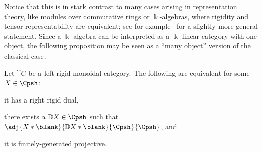 Notice that this is in stark contrast to many cases arising in representation theory,
like modules over commutative rings or \(\Bbbk\)\hyp{}algebras,
where rigidity and tensor representability are equivalent;
see for example~\cite[Proposition~2.1]{niefield17:coexp} for a slightly more general statement.
Since a \(\Bbbk\)\hyp{}algebra can be interpreted as a \(\Bbbk\)\hyp{}linear category with one object,
the following proposition may be seen as a ``many object'' version of the classical case.

\begin{proposition}\label{prop:characterisation-of-rigidity}
  Let \(\cat{C}\) be a left rigid monoidal category.
  The following are equivalent for some \(X \in \Cpsh\):
  \begin{thmlist}[noitemsep]
  \item\label{itm:char-rigid} it has a right rigid dual,
  \item\label{itm:char-trep} there exists a \(\mathbb{D}X \in \Cpsh\) such that \(\adj{X * \blank}{\mathbb{D}X * \blank}{\Cpsh}{\Cpsh}\), and
  \item\label{itm:char-fgp} it is finitely\hyp{}generated projective.
  \end{thmlist}
\end{proposition}
